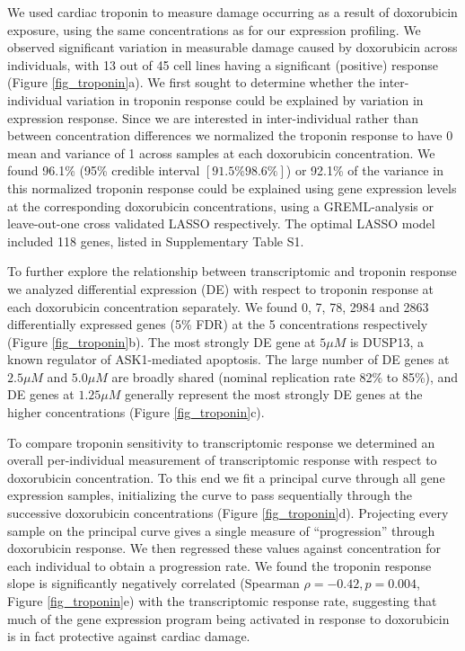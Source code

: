 \documentclass{article}
\begin{document}
{We used cardiac troponin to measure damage occurring as a result of doxorubicin exposure, using the same concentrations as for our expression profiling. We observed significant variation in measurable damage caused by doxorubicin across individuals, with 13 out of 45 cell lines having a significant (positive) response (Figure \ref{fig_troponin}a). We first sought to determine whether the inter-individual variation in troponin response could be explained by variation in expression response. Since we are interested in inter-individual rather than between concentration differences we normalized the troponin response to have 0 mean and variance of 1 across samples at each doxorubicin concentration. We found 96.1\% (95\% credible interval $[91.5\% 98.6\%]$) or 92.1\% of the variance in this normalized troponin response could be explained using gene expression levels at the corresponding doxorubicin concentrations, using a GREML-analysis\cite{Yang2010-cx} or leave-out-one cross validated LASSO\cite{tibshirani1996regression} respectively. The optimal LASSO model included 118 genes, listed in Supplementary Table S1. 

To further explore the relationship between transcriptomic and troponin response we analyzed differential expression (DE) with respect to troponin response at each doxorubicin concentration separately. We found 0, 7, 78, 2984 and 2863 differentially expressed genes (5\% FDR) at the 5 concentrations respectively (Figure \ref{fig_troponin}b). The most strongly DE gene at $5 \mu M$ is DUSP13, a known regulator of ASK1-mediated apoptosis\cite{park2010positive}. The large number of DE genes at $2.5 \mu M$ and $5.0 \mu M$ are broadly shared (nominal replication rate 82\% to 85\%), and DE genes at $1.25 \mu M$ generally represent the most strongly DE genes at the higher concentrations (Figure \ref{fig_troponin}c). 

To compare troponin sensitivity to transcriptomic response we determined an overall per-individual measurement of transcriptomic response with respect to doxorubicin concentration. To this end we fit a principal curve\citep{hastie1989principal} through all gene expression samples, initializing the curve to pass sequentially through the successive doxorubicin concentrations (Figure \ref{fig_troponin}d). Projecting every sample on the principal curve gives a single measure of ``progression'' through doxorubicin response. We then regressed these values against concentration for each individual to obtain a progression rate. We found the troponin response slope is significantly negatively correlated (Spearman $\rho=-0.42, p=0.004$, Figure \ref{fig_troponin}e) with the transcriptomic response rate, suggesting that much of the gene expression program being activated in response to doxorubicin is in fact protective against cardiac damage. 

}
\end{document}
